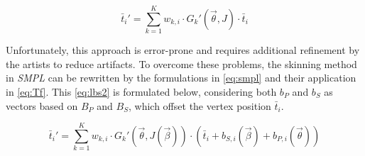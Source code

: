 \begin{equation}
\label{eq:lbs}
\bar{t}_{i}' = \sum_{k=1}^{K} w_{k,i} \cdot G_{k}'(\vec{\theta},J) \cdot \bar{t}_{i}
\end{equation}

Unfortunately, this approach is error-prone and requires additional refinement by the artists to reduce artifacts. To overcome these problems, the skinning method in \emph{SMPL} can be rewritten by the formulations in \autoref{eq:smpl} and their application in \autoref{eq:Tf}. This \autoref{eq:lbs2} is formulated below, considering both $b_{P}$ and $b_{S}$ as vectors based on $B_{P}$ and $B_{S}$, which offset the vertex position $\bar{t}_{i}$.

\begin{equation}
\label{eq:lbs2}
\bar{t}_{i}' = \sum_{k=1}^{K} w_{k,i} \cdot G_{k}'(\vec{\theta},J(\vec{\beta})) \cdot (\bar{t}_{i} + b_{S,i}(\vec{\beta}) + b_{P,i}(\vec{\theta}))
\end{equation}

